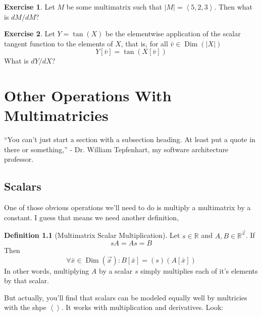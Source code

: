 \documentclass[12pt]{book}
\theoremstyle{plain}
\theoremstyle{definition}
\newtheorem{definition}{Definition}[chapter]
\newtheorem{exercise}{Exercise}[chapter]
\theoremstyle{ppart}
\theoremstyle{case}
\theoremstyle{solution}
\DeclareMathOperator{\Dim}{Dim}
\newcommand{\shape}[1]{\left|#1\right|}
\begin{document}
\begin{exercise}
Let $M$ be some multimatrix such that $\shape{M} = \left<5,2,3\right>$. Then what is
$dM/dM$?
\end{exercise}

\begin{exercise}
Let $Y = \tan(X)$ be the elementwise application of the scalar tangent function to
the elements of $X$, that is, for all $\bar{v} \in \Dim(\shape{X})$
\[ Y[\bar{v}] = \tan(X[\bar{v}]) \]
What is $dY/dX$?
\end{exercise}

\chapter{Other Operations With Multimatricies}

\begin{displayquote}
``You can't just start a section with a subsection heading. At least put a quote
in there or something,'' - Dr. William Tepfenhart, my software architecture professor.
\end{displayquote}

\section{Scalars}

One of those obvious operations we'll need to do is multiply
a multimatrix by a constant. I guess that means we need another definition,

\begin{definition}[Multimatrix Scalar Multiplication]
Let $s \in \mathbb{R}$ and $A, B \in \mathbb{R}^{\vec{x}}$. If
\[ sA = As = B \]
Then
\[ \forall \bar{x} \in \Dim(\vec{x}):
   B[\bar{x}] = (s)(A[\bar{x}]) \]
In other words, multiplying $A$ by a scalar $s$ simply multiplies each of
it's elements by that scalar.
\end{definition}

But actually, you'll find that scalars can be modeled equally well by multricies
with the shpe $\left<\right>$. It works with multiplication and derivatives. Look:
\end{document}
